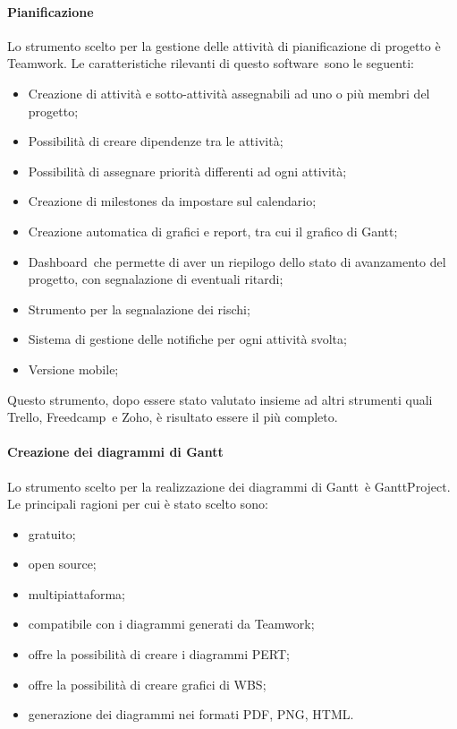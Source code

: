 \documentclass[../NormeProgetto.tex]{subfiles}
\begin{document}
			\paragraph{Pianificazione} \label{sec: Pianificazione Teamwork}
				Lo strumento scelto per la gestione delle attività di pianificazione di progetto è Teamwork\g. Le caratteristiche rilevanti di questo software\g\ sono le seguenti:
				\begin{itemize}
					\item Creazione di attività e sotto-attività assegnabili ad uno o più membri del progetto;
					\item Possibilità di creare dipendenze tra le attività;
					\item Possibilità di assegnare priorità differenti ad ogni attività;
					\item Creazione di milestones da impostare sul calendario;
					\item Creazione automatica di grafici e report, tra cui il grafico di Gantt;
					\item Dashboard\g\ che permette di aver un riepilogo dello stato di avanzamento del progetto, con segnalazione di eventuali ritardi;
					\item Strumento per la segnalazione dei rischi;
					\item Sistema di gestione delle notifiche per ogni attività svolta;
					\item Versione mobile;
				\end{itemize}		 
				Questo strumento, dopo essere stato valutato insieme ad altri strumenti quali Trello, Freedcamp\g\ e Zoho, è risultato essere il più completo.
			
			\paragraph{Creazione dei diagrammi di Gantt}
				Lo strumento scelto per la realizzazione dei diagrammi di Gantt\g\ è GanttProject. Le principali ragioni per cui è stato scelto sono:
				\begin{itemize}
					\item gratuito;
					\item open source\g;
					\item multipiattaforma;
					\item compatibile con i diagrammi generati da Teamwork\g;
					\item offre la possibilità di creare i diagrammi PERT\g;
					\item offre la possibilità di creare grafici di WBS\g;
					\item generazione dei diagrammi nei formati PDF\g, PNG\g, HTML\g.
				\end{itemize}
\end{document}
